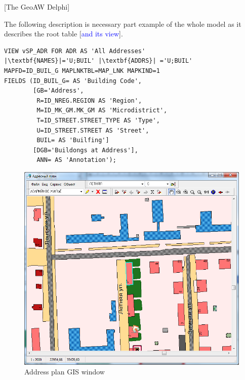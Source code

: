 \documentclass[conference]{IEEEtran}
\newcommand{\e}[2][fcolor]{\textcolor{pcolor}{[}\textcolor{#1}{#2}\textcolor{pcolor}{]}}
\begin{document}
\e{The GeoAW Delphi}

The following description is necessary part example of the whole model as it describes the root table \e[blue]{and its view}.

\begin{lstlisting}
VIEW vSP_ADR FOR ADR AS 'All Addresses'
|\textbf{NAMES}|='U;BUIL' |\textbf{ADDRS}| ='U;BUIL'
MAPFD=ID_BUIL_G MAPLNKTBL=MAP_LNK MAPKIND=1
FIELDS (ID_BUIL_G= AS 'Building Code',
        [GB='Address',
         R=ID_NREG.REGION AS 'Region',
         M=ID_MK_GM.MK_GM AS 'Microdistrict',
         T=ID_STREET.STREET_TYPE AS 'Type',
         U=ID_STREET.STREET AS 'Street',
         BUIL= AS 'Builfing']
        [DGB='Buildongs at Address'],
         ANN= AS 'Annotation');
\end{lstlisting}

\begin{figure}[tb]
  \centering
  \includegraphics[width=\linewidth]{addressplan.png}
  \caption{Address plan GIS window}
  \label{fig:addrplan}
\end{figure}


%
%
\end{document}
